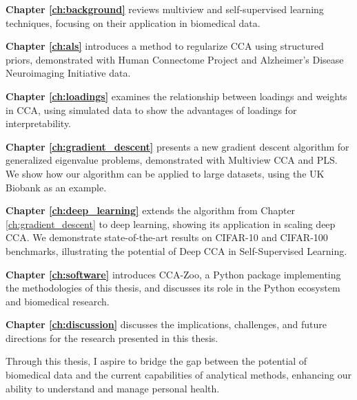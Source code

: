 \textbf{Chapter \ref{ch:background}} reviews multiview and self-supervised learning techniques, focusing on their application in biomedical data.

\textbf{Chapter \ref{ch:als}} introduces a method to regularize CCA using structured priors, demonstrated with Human Connectome Project and Alzheimer's Disease Neuroimaging Initiative data.

\textbf{Chapter \ref{ch:loadings}} examines the relationship between loadings and weights in CCA, using simulated data to show the advantages of loadings for interpretability.

\textbf{Chapter \ref{ch:gradient_descent}} presents a new gradient descent algorithm for generalized eigenvalue problems, demonstrated with Multiview CCA and PLS. We show how our algorithm can be applied to large datasets, using the UK Biobank as an example.

\textbf{Chapter \ref{ch:deep_learning}} extends the algorithm from Chapter \ref{ch:gradient_descent} to deep learning, showing its application in scaling deep CCA. We demonstrate state-of-the-art results on CIFAR-10 and CIFAR-100 benchmarks, illustrating the potential of Deep CCA in Self-Supervised Learning.

\textbf{Chapter \ref{ch:software}} introduces CCA-Zoo, a Python package implementing the methodologies of this thesis, and discusses its role in the Python ecosystem and biomedical research.

\textbf{Chapter \ref{ch:discussion}} discusses the implications, challenges, and future directions for the research presented in this thesis.

Through this thesis, I aspire to bridge the gap between the potential of biomedical data and the current capabilities of analytical methods, enhancing our ability to understand and manage personal health.
